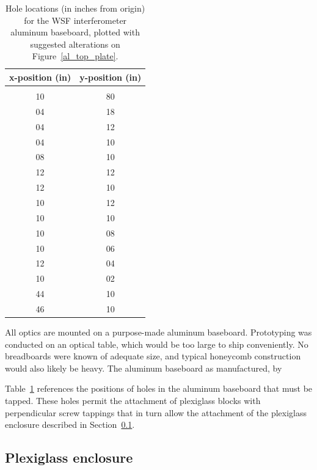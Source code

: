 \begin{table}[t]
\begin{center}
\begin{tabular}{ c c }
x-position (in) & y-position (in) \\
\hline \\
10 & 80\\
04 & 18\\
04 & 12\\
04 & 10\\
08 & 10\\
12 & 12\\
12 & 10\\
10 & 12\\
10 & 10\\
10 & 08\\
10 & 06\\
12 & 04\\
10 & 02\\
44 & 10\\
46 & 10 \\
\hline
\end{tabular}
\caption{Hole locations (in inches from origin) for the WSF interferometer aluminum baseboard, plotted with suggested alterations on Figure~\ref{al_top_plate}.}
\label{aluminum_baseboard_hole_locations}
\end{center}
\end{table}

All optics are mounted on a purpose-made aluminum baseboard.
Prototyping was conducted on an optical table, which would be too large to ship conveniently.
No breadboards were known of adequate size, and typical honeycomb construction would also likely be heavy.
The aluminum baseboard as manufactured, by 

Table~\ref{aluminum_baseboard_hole_locations} references the positions of holes in the aluminum baseboard that must be tapped. These holes permit the attachment of plexiglass blocks with perpendicular screw tappings that in turn allow the attachment of the plexiglass enclosure described in Section~\ref{enclosure}.

        \subsection{Plexiglass enclosure}
        \label{enclosure}



